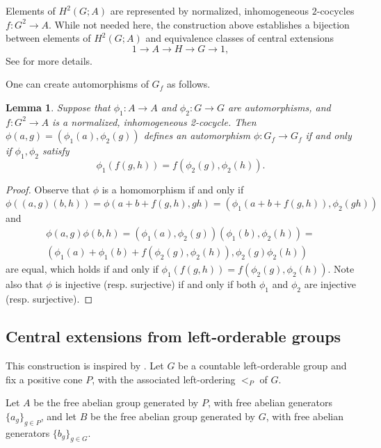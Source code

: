 \documentclass{amsart}
\newtheorem{lemma}[theorem]{Lemma}
\theoremstyle{definition}
\theoremstyle{remark}
\begin{document}
Elements of $H^2(G; A)$ are represented by normalized, inhomogeneous $2$-cocycles $f \colon G^2 \rightarrow A$. While not needed here, the construction above establishes a bijection between elements of $H^2(G; A)$ and equivalence classes of central extensions
\[ 1 \longrightarrow A \longrightarrow H \longrightarrow G \longrightarrow 1,
\]
See \cite[Chapter 4]{brown94} for more details.



One can create automorphisms of $G_f$ as follows.  

\begin{lemma}
\label{lem:aut1}
Suppose that $\phi_1 \colon A \rightarrow A$ and $\phi_2 \colon G \rightarrow G$ are automorphisms, and $f\colon G^2 \rightarrow A$ is a normalized, inhomogeneous 2-cocycle.  Then $\phi(a, g) = (\phi_1(a), \phi_2(g))$ defines an automorphism  $\phi \colon G_f \rightarrow G_f$ if and only if $\phi_1, \phi_2$ satisfy 
\[ \phi_1(f(g, h)) = f(\phi_2(g), \phi_2(h)).
\]
\end{lemma}
\begin{proof}Observe that $\phi$ is a homomorphism if and only if
\[ \phi((a, g)(b, h)) = \phi(a+b+f(g,h), gh) = (\phi_1(a+b+f(g,h)), \phi_2(gh))
\]
and
\begin{multline*}
    \phi(a,g)\phi(b,h) = (\phi_1(a), \phi_2(g))(\phi_1(b), \phi_2(h)) =\\ (\phi_1(a)+\phi_1(b)+f(\phi_2(g), \phi_2(h)),\phi_2(g) \phi_2(h) )
\end{multline*}
are equal, which holds if and only if $\phi_1(f(g, h)) = f(\phi_2(g), \phi_2(h))$.  Note also that $\phi$ is injective (resp. surjective) if and only if both $\phi_1$ and $\phi_2$ are injective (resp. surjective).
\end{proof}



\subsection{Central extensions from left-orderable groups}

This construction is inspired by \cite[Exercise 2.E.35]{loh17}.  Let \(G\) be a countable left-orderable group and fix a positive cone \(P\), with the associated left-ordering $<_P$ of $G$.

Let \(A\) be the free abelian group generated by \(P\), with free abelian generators $\{a_g\}_{g \in P}$, and let \(B\) be the free abelian group generated by \(G\), with free abelian generators $\{b_g\}_{g\in G}$. 
\end{document}
